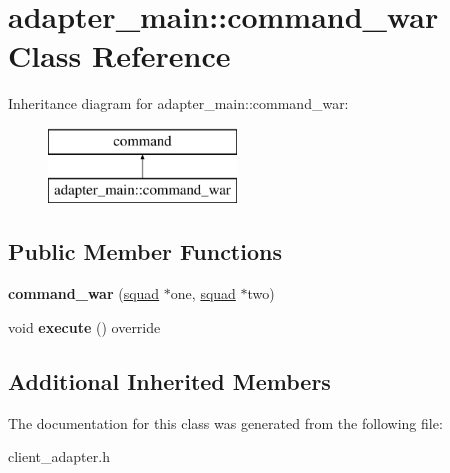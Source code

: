 \hypertarget{classadapter__main_1_1command__war}{}\section{adapter\+\_\+main\+:\+:command\+\_\+war Class Reference}
\label{classadapter__main_1_1command__war}
Inheritance diagram for adapter\+\_\+main\+:\+:command\+\_\+war\+:\begin{figure}[H]
\begin{center}
\leavevmode
\includegraphics[height=2.000000cm]{classadapter__main_1_1command__war}
\end{center}
\end{figure}
\subsection*{Public Member Functions}
\begin{DoxyCompactItemize}
\item 
\mbox{\label{classadapter__main_1_1command__war_aeaf39a056c309d07f7ab1284faf7a994}} 
{\bfseries command\+\_\+war} (\mbox{\hyperlink{classsquad}{squad}} $\ast$one, \mbox{\hyperlink{classsquad}{squad}} $\ast$two)
\item 
\mbox{\label{classadapter__main_1_1command__war_a521f1f6a3ba4c96214d5167f0df25913}} 
void {\bfseries execute} () override
\end{DoxyCompactItemize}
\subsection*{Additional Inherited Members}


The documentation for this class was generated from the following file\+:\begin{DoxyCompactItemize}
\item 
client\+\_\+adapter.\+h\end{DoxyCompactItemize}
